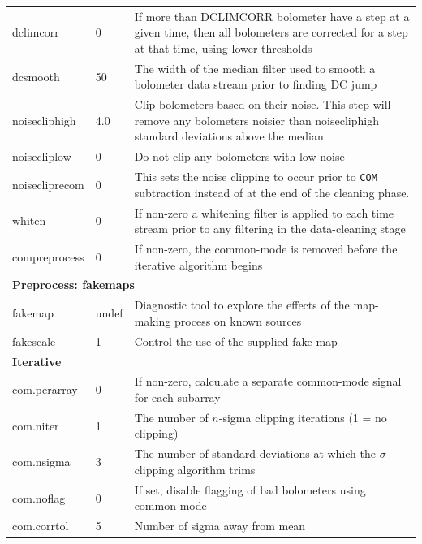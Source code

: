 \documentclass[twoside,11pt]{article}
\renewcommand{\_}{\texttt{\symbol{95}}}
\begin{document}
\begin{htmlonly}
\begin{table}
\begin{center}
\begin{small}
\begin{tabular}{|p{2.2cm}|p{1.1cm}|p{11.4cm}|}
dclimcorr     &    0 & If more than DCLIMCORR bolometer have a step at
                       a given time, then all bolometers are corrected for
                       a step at that time, using lower thresholds \\
dcsmooth      &   50 & The width of the median filter used to smooth a
                       bolometer data stream prior to finding DC jump \\
noisecliphigh &  4.0 & Clip bolometers based on their noise. This step
                       will remove any bolometers noisier than noisecliphigh
                       standard deviations above the median \\
noisecliplow   &   0 & Do not clip any bolometers with low noise \\
noisecliprecom &   0 & This sets the noise clipping to occur prior to
                       \texttt{COM} subtraction instead of at the end of
                       the cleaning phase.\\
whiten         &   0 & If non-zero a whitening filter is applied to each
                       time stream prior to any filtering in the
                       data-cleaning stage \\
compreprocess  &   0 & If non-zero, the common-mode is removed before the
                       iterative algorithm begins \\
\hline
\multicolumn{3}{|l|}{\textbf{Preprocess: fakemaps}}\\
\hline
fakemap         & undef & Diagnostic tool to explore the effects of the
                          map-making process on known sources \\
fakescale       &     1 & Control the use of the supplied fake map \\
\hline
\multicolumn{3}{|l|}{\textbf{Iterative}}\\
\hline
com.perarray     &      0 & If non-zero, calculate a separate common-mode
                            signal for each subarray \\
com.niter        &      1 & The number of $n$-sigma clipping iterations
                            (1 = no clipping) \\
com.nsigma       &      3 & The number of standard deviations at which
                            the $\sigma$-clipping algorithm trims \\
com.noflag       &      0 & If set, disable flagging of bad bolometers
                            using common-mode \\
com.corr\_tol    &      5 & Number of sigma away from mean

\end{tabular}
\end{small}
\end{center}
\end{table}
\end{htmlonly}
\end{document}
